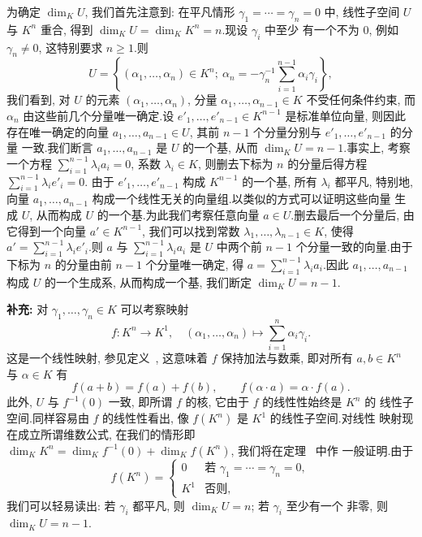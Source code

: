 为确定 $\dim_K U$, 我们首先注意到: 在平凡情形 $\gamma_1 = \cdots = \gamma_n = 0$ 中,
线性子空间 $U$ 与 $K^n$ 重合, 得到 $\dim_K U = \dim_K K^n = n$.现设 $\gamma_i$ 中至少
有一个不为 $0$, 例如 $\gamma_n \neq 0$, 这特别要求 $n \geq 1$.则
\[
U = \left\{ (\alpha_1, \ldots, \alpha_n) \in K^n ;\ \alpha_n = -\gamma_n^{-1} \sum_{i=1}^{n-1} \alpha_i \gamma_i \right\},
\]
我们看到, 对 $U$ 的元素 $(\alpha_1, \ldots, \alpha_n)$, 分量 $\alpha_1, \ldots,
\alpha_{n-1} \in K$ 不受任何条件约束, 而 $\alpha_n$ 由这些前几个分量唯一确定.设
$e'_1, \ldots, e'_{n-1} \in K^{n-1}$ 是标准单位向量, 则因此存在唯一确定的向量
$a_1, \ldots, a_{n-1} \in U$, 其前 $n-1$ 个分量分别与 $e'_1, \ldots, e'_{n-1}$ 的分量
一致.我们断言 $a_1, \ldots, a_{n-1}$ 是 $U$ 的一个基, 从而
$\dim_K U = n - 1$.事实上, 考察一个方程 $\sum_{i=1}^{n-1} \lambda_i a_i = 0$, 系数
$\lambda_i \in K$, 则删去下标为 $n$ 的分量后得方程 $\sum_{i=1}^{n-1} \lambda_i e'_i = 0$.
由于 $e'_1, \ldots, e'_{n-1}$ 构成 $K^{n-1}$ 的一个基, 所有 $\lambda_i$ 都平凡, 特别地,
向量 $a_1, \ldots, a_{n-1}$ 构成一个线性无关的向量组.以类似的方式可以证明这些向量
生成 $U$, 从而构成 $U$ 的一个基.为此我们考察任意向量 $a \in U$.删去最后一个分量后,
由它得到一个向量 $a' \in K^{n-1}$, 我们可以找到常数 $\lambda_1, \ldots, \lambda_{n-1}
\in K$, 使得 $a' = \sum_{i=1}^{n-1} \lambda_i e'_i$.则 $a$ 与
$\sum_{i=1}^{n-1} \lambda_i a_i$ 是 $U$ 中两个前 $n-1$ 个分量一致的向量.由于下标为 $n$
的分量由前 $n-1$ 个分量唯一确定, 得 $a = \sum_{i=1}^{n-1} \lambda_i a_i$.因此
$a_1, \ldots, a_{n-1}$ 构成 $U$ 的一个生成系, 从而构成一个基, 我们断定
$\dim_K U = n - 1$.

\noindent\textbf{补充:} 对 $\gamma_1, \ldots, \gamma_n \in K$ 可以考察映射
\[
f \colon K^n \longrightarrow K^1, \quad (\alpha_1, \ldots, \alpha_n) \longmapsto \sum_{i=1}^{n} \alpha_i \gamma_i\text{.}
\]
这是一个线性映射, 参见定义~, 这意味着 $f$ 保持加法与数乘, 即对所有
$a, b \in K^n$ 与 $\alpha \in K$ 有
\[
f(a + b) = f(a) + f(b), \qquad f(\alpha \cdot a) = \alpha \cdot f(a)\text{.}
\]
此外, $U$ 与 $f^{-1}(0)$ 一致, 即所谓 $f$ 的核, 它由于 $f$ 的线性性始终是 $K^n$ 的
线性子空间.同样容易由 $f$ 的线性性看出, 像 $f(K^n)$ 是 $K^1$ 的线性子空间.对线性
映射现在成立所谓维数公式, 在我们的情形即
$\dim_K K^n = \dim_K f^{-1}(0) + \dim_K f(K^n)$, 我们将在定理~ 中作
一般证明.由于
\[
f(K^n) = \begin{cases} 0 & \text{若 } \gamma_1 = \cdots = \gamma_n = 0, \\ K^1 & \text{否则,} \end{cases}
\]
我们可以轻易读出: 若 $\gamma_i$ 都平凡, 则 $\dim_K U = n$; 若 $\gamma_i$ 至少有一个
非零, 则 $\dim_K U = n - 1$.

